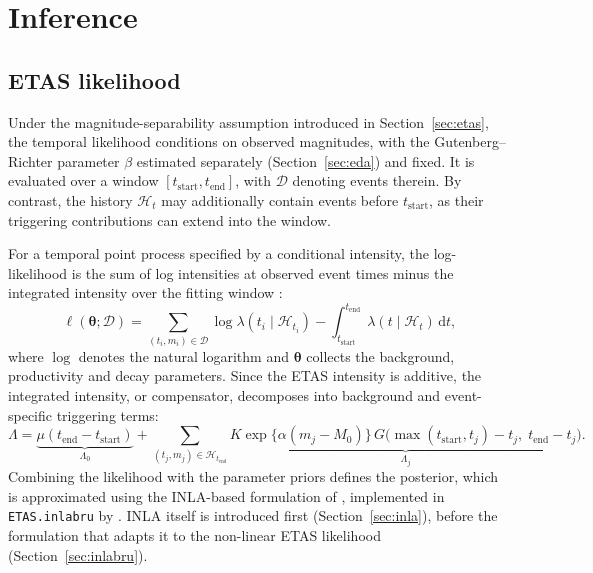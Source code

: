 \documentclass{statsmsc}
\begin{document}
\section{Inference} \label{sec:inference}

\subsection{ETAS likelihood} \label{sec:likelihood}
Under the magnitude-separability assumption introduced in Section~\ref{sec:etas}, the temporal likelihood conditions on observed magnitudes, with the Gutenberg--Richter parameter $\beta$ estimated separately (Section~\ref{sec:eda}) and fixed. It is evaluated over a window $[t_\mathrm{start},t_\mathrm{end}]$, with $\mathcal{D}$ denoting events therein. By contrast, the history $\mathcal{H}_t$ may additionally contain events before $t_\mathrm{start}$, as their triggering contributions can extend into the window. 

For a temporal point process specified by a conditional intensity, the log-likelihood is the sum of log intensities at observed event times minus the integrated intensity over the fitting window \citep{ogata1988statistical}:
\begin{equation} \label{eq:loglik} 
\ell(\boldsymbol{\theta}; \mathcal{D}) =\sum_{(t_i, m_i) \in \mathcal{D}} \log  \lambda(t_i \mid \mathcal{H}_{t_i}) -  \int_{t_\mathrm{start}}^{t_\mathrm{end}} \lambda(t \mid \mathcal{H}_t)\,\mathrm{d}t,
\end{equation}
where $\log$ denotes the natural logarithm and $\boldsymbol{\theta}$ collects the background, productivity and decay parameters. Since the ETAS intensity is additive, the integrated intensity, or compensator, decomposes into background and event-specific triggering terms:
\begin{equation}\label{eq:compensator}
\Lambda = \underbrace{\mu (t_\mathrm{end} - t_\mathrm{start})}_{\Lambda_0} + \sum_{(t_j, m_j) \in \mathcal{H}_{t_\mathrm{end}}} \underbrace{K \exp\{\alpha (m_j - M_0)\} \, G\big(\max(t_\mathrm{start}, t_j) - t_j,\; t_\mathrm{end} - t_j\big)}_{\Lambda_j}.
\end{equation}
Combining the likelihood with the parameter priors defines the posterior, which is approximated using the INLA-based formulation of \citet{serafini2023approximation}, implemented in \texttt{ETAS.inlabru} by \citet{naylor2023bayesian}. INLA itself is introduced first (Section~\ref{sec:inla}), before the formulation that adapts it to the non-linear ETAS likelihood (Section~\ref{sec:inlabru}).
\end{document}
